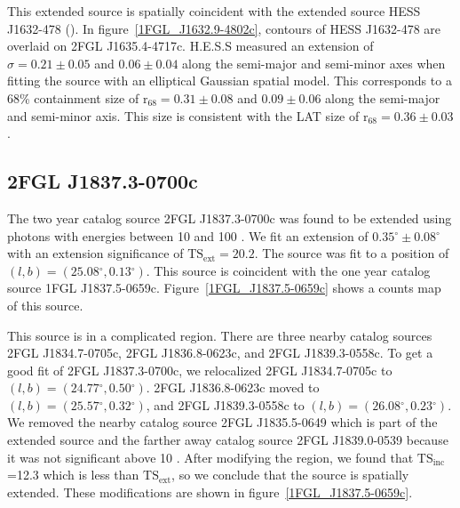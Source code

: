 \documentclass[12pt,preprint]{aastex}
\newcommand{\gev}{\text{GeV}\xspace}
\newcommand{\tev}{\text{TeV}\xspace}
\newcommand{\tsext}{{\ensuremath{\text{TS}_\text{ext}}}\xspace}
\newcommand{\tsinc}{\ensuremath{\text{TS}_\text{inc}}\xspace}
\newcommand{\rsixeight}{{\ensuremath{\text{r}_{68}}}\xspace}
\renewcommand{\deg}{\ensuremath{^\circ}\xspace}
\begin{document}
This extended source is spatially coincident with the extended \tev source HESS
J1632-478 (\cite{hess_plane_survey}).  In figure~\ref{1FGL_J1632.9-4802c},
contours of  HESS J1632-478 are overlaid on 2FGL J1635.4-4717c.
H.E.S.S measured an extension of $\sigma=0.21\pm0.05$ and
$0.06\pm0.04$ along the semi-major and semi-minor axes when fitting the source
with an elliptical Gaussian spatial model.  This corresponds to a 68\%
containment size of $\rsixeight=0.31\pm0.08$ and $0.09\pm0.06$ along the
semi-major and semi-minor axis. This size is consistent with the LAT size of
$\rsixeight=0.36\pm0.03$.


\subsection{2FGL J1837.3-0700c}
\label{section_2FGL_J1837.3-0700c}




The two year catalog source 2FGL J1837.3-0700c was found to be
extended using photons with energies between 10 \gev and 100 \gev.
We fit an extension of $0.35\deg\pm0.08\deg$ with an extension
significance of $\tsext=20.2$.  The source was fit to a position of
$(l,b)=(25.08\deg,0.13\deg)$.  This source is coincident with the one
year catalog source 1FGL J1837.5-0659c.  Figure~\ref{1FGL_J1837.5-0659c}
shows a counts map of this source.

This source is in a complicated region. There are three nearby catalog
sources 
2FGL J1834.7-0705c, 2FGL J1836.8-0623c, and 2FGL J1839.3-0558c.
To get a good fit of 2FGL J1837.3-0700c,
we relocalized 
2FGL J1834.7-0705c to $(l,b)=(24.77\deg,0.50\deg)$.  
2FGL J1836.8-0623c moved to $(l,b)=(25.57\deg,0.32\deg)$, and 
2FGL J1839.3-0558c to $(l,b)=(26.08\deg,0.23\deg)$.  
We removed the nearby catalog source 2FGL J1835.5-0649 which is part
of the extended source and the farther away catalog
source 2FGL J1839.0-0539 because it was not significant above 10 \gev.
After modifying the region, we found that \tsinc=12.3 which is less
than \tsext, so we conclude that the source is spatially extended. These
modifications are shown in figure~\ref{1FGL_J1837.5-0659c}.
\end{document}
